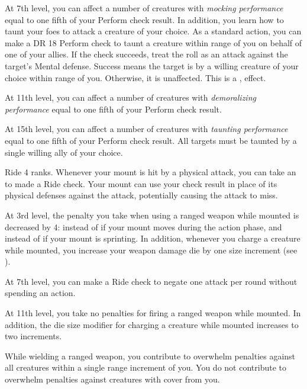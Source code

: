     At 7th level, you can affect a number of creatures with \textit{mocking performance} equal to one fifth of your Perform check result.
    In addition, you learn how to taunt your foes to attack a creature of your choice.
     As a standard action, you can make a DR 18 Perform check to taunt a creature within \rngmed range of you on behalf of one of your allies.
    If the check succeeds, treat the roll as an attack against the target's Mental defense.
    Success means the target is \taunted by a willing creature of your choice within \rngmed range of you.
    Otherwise, it is unaffected.
    This is a ,  effect.

    At 11th level, you can affect a number of creatures with \textit{demoralizing performance} equal to one fifth of your Perform check result.

    At 15th level, you can affect a number of creatures with \textit{taunting performance} equal to one fifth of your Perform check result.
    All targets must be taunted by a single willing ally of your choice.

    \featpre Ride 4 ranks.
    \featben Whenever your mount is hit by a physical attack, you can take an  to made a Ride check.
    Your mount can use your check result in place of its physical defenses against the attack, potentially causing the attack to miss.

    At 3rd level, the penalty you take when using a ranged weapon while mounted is decreased by 4:  instead of  if your mount moves during the action phase, and  instead of  if your mount is sprinting.
    In addition, whenever you charge a creature while mounted, you increase your weapon damage die by one size increment (see ).

    At 7th level, you can make a Ride check to negate one attack per round without spending an action.

    At 11th level, you take no penalties for firing a ranged weapon while mounted.
    In addition, the die size modifier for charging a creature while mounted increases to two increments.

    \featben While wielding a ranged weapon, you contribute to overwhelm penalties against all creatures within a single range increment of you.
    You do not contribute to overwhelm penalties against creatures with cover from you.

